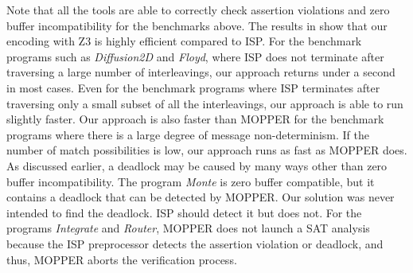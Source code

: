 Note that all the tools are able to correctly check assertion violations and zero buffer incompatibility for the benchmarks above. The results in  show that our encoding with Z3 is highly efficient compared to ISP. For the benchmark programs such as \textit{Diffusion2D} and \textit{Floyd}, where ISP does not terminate after traversing a large number of interleavings, our approach returns under a second in most cases. Even for the benchmark programs where ISP terminates after traversing only a small subset of all the interleavings, our approach is able to run slightly faster. Our approach is also faster than MOPPER for the benchmark programs where there is a large degree of message non-determinism. If the number of match possibilities is low, our approach runs as fast as MOPPER does. As discussed earlier, a deadlock may be caused by many ways other than zero buffer incompatibility. The program \textit{Monte} is zero buffer compatible, but it contains a deadlock that can be detected by MOPPER. Our solution was never intended to find the deadlock. ISP should detect it but does not. For the programs \textit{Integrate} and \textit{Router}, MOPPER does not launch a SAT analysis because the ISP preprocessor detects the assertion violation or deadlock, and thus, MOPPER aborts the verification process. 


